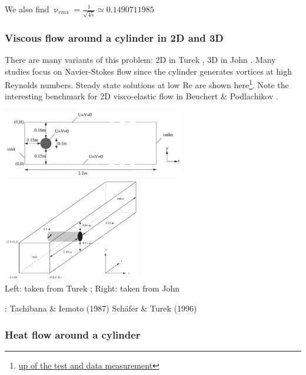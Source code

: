 We also find $\upnu_{rms}=\frac{1}{\sqrt{45}}\simeq 0.1490711985$



\subsubsection{Viscous flow around a cylinder in 2D and 3D } \label{sec:flowcyl}

There are many variants of this problem: 2D in Turek \cite{turek}, 3D in John \cite{john02}.
Many studies focus on Navier-Stokes flow since the cylinder generates
vortices at high Reynolds numbers. Steady state solutions at low Re are shown 
here\footnote{\url{up of the test and data measurement}}.
Note the interesting benchmark for 2D visco-elastic flow in Beuchert \& Podlachikov \cite{bepo10}.

\begin{center}
\includegraphics[width=8cm]{images/benchmark_flow_cylinder/turek}
\includegraphics[width=6cm]{images/benchmark_flow_cylinder/john02}\\
{\captionfont Left: taken from Turek \cite{turek}; Right: taken from John \cite{john02}}
\end{center}

\Literature: Tachibana \& Iemoto (1987) \cite{taie87}
Sch\"afer \& Turek (1996) \cite{sctu96}


\subsubsection{Heat flow around a cylinder} \label{sec:hfcyl}

